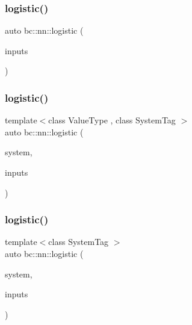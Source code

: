 \subsubsection{\texorpdfstring{logistic()}{logistic()}\hspace{0.1cm}{\footnotesize\ttfamily [1/5]}}
{\footnotesize\ttfamily auto bc\+::nn\+::logistic (\begin{DoxyParamCaption}\item[{\hyperlink{namespacebc_aaf8e3fbf99b04b1b57c4f80c6f55d3c5}{bc\+::size\+\_\+t}}]{inputs }\end{DoxyParamCaption})}

\mbox{\label{namespacebc_1_1nn_a56e8a819ad99c89d7e2dbb5359f72fba}} 
\subsubsection{\texorpdfstring{logistic()}{logistic()}\hspace{0.1cm}{\footnotesize\ttfamily [2/5]}}
{\footnotesize\ttfamily template$<$class Value\+Type , class System\+Tag $>$ \\
auto bc\+::nn\+::logistic (\begin{DoxyParamCaption}\item[{System\+Tag}]{system,  }\item[{\hyperlink{namespacebc_aaf8e3fbf99b04b1b57c4f80c6f55d3c5}{bc\+::size\+\_\+t}}]{inputs }\end{DoxyParamCaption})}

\mbox{\label{namespacebc_1_1nn_ab2671a4c0d9e2e4f2b6abeb7290e9c61}} 
\subsubsection{\texorpdfstring{logistic()}{logistic()}\hspace{0.1cm}{\footnotesize\ttfamily [3/5]}}
{\footnotesize\ttfamily template$<$class System\+Tag $>$ \\
auto bc\+::nn\+::logistic (\begin{DoxyParamCaption}\item[{System\+Tag}]{system,  }\item[{\hyperlink{namespacebc_aaf8e3fbf99b04b1b57c4f80c6f55d3c5}{bc\+::size\+\_\+t}}]{inputs }\end{DoxyParamCaption})}

